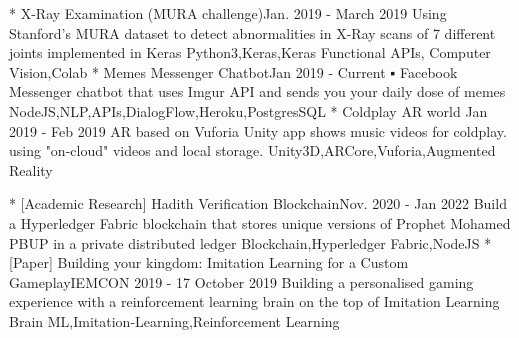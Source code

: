 %
%

\twocolumnsection
{ 
\begin{projects}
		\project
	{* X-Ray Examination (MURA challenge)}{Jan. 2019 - March 2019}
	{}
	{Using Stanford's MURA dataset to detect abnormalities in X-Ray scans of 7 different joints
implemented in Keras}
	{Python3,Keras,Keras Functional APIs, Computer Vision,Colab}	
		\project
	{* Memes Messenger Chatbot}{Jan 2019 - Current}
	{ }
	{▪	Facebook Messenger chatbot that uses Imgur API and sends you your daily dose of memes }
	{NodeJS,NLP,APIs,DialogFlow,Heroku,PostgresSQL}
		\project
	{* Coldplay AR world }{Jan 2019 - Feb 2019}
	{ 
	}
	{AR based on Vuforia Unity app shows music videos for coldplay. using "on-cloud" videos and local storage.}
	{Unity3D,ARCore,Vuforia,Augmented Reality}
\end{projects}}
{
\begin{projects}
		\project
	{* [Academic Research] Hadith Verification Blockchain}{Nov. 2020 - Jan 2022}
	{}
	{Build a Hyperledger Fabric blockchain that stores unique versions of Prophet Mohamed PBUP in a private distributed ledger }
	{Blockchain,Hyperledger Fabric,NodeJS}	
			\project
	{* [Paper] Building your kingdom: Imitation Learning for a Custom Gameplay}{IEMCON 2019 - 17 October 2019}
	{\paperSymbol{ }
	}
	{Building a personalised gaming experience with a reinforcement learning brain on the top of Imitation Learning Brain}
	{ML,Imitation-Learning,Reinforcement Learning}
\end{projects}}


